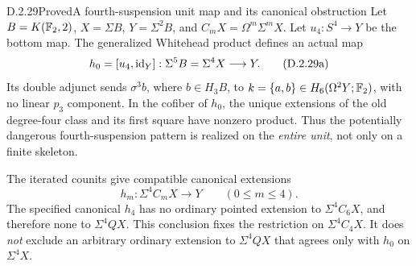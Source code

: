 \begin{claim}{D.2.29}{Proved}{A fourth-suspension unit map and its canonical obstruction}
Let $B=K(\mathbb F_2,2)$, $X=\Sigma B$, $Y=\Sigma^2B$, and
$C_mX=\Omega^m\Sigma^mX$.  Let $u_4:S^4\to Y$ be the
bottom map.  The generalized Whitehead product defines an actual map
\[
 h_0=[u_4,\mathrm{id}_Y]:\Sigma^5B=\Sigma^4X\longrightarrow Y.
 \tag{D.2.29a}
\]
Its double adjunct sends $\sigma^3b$, where $b\in H_3B$,
to $k=\{a,b\}\in H_6(\Omega^2Y;\mathbb F_2)$, with no linear
$p_3$ component.  In the cofiber of $h_0$, the unique extensions
of the old degree-four class and its first square have nonzero product.
Thus the potentially dangerous fourth-suspension pattern is realized
on the \emph{entire unit}, not only on a finite skeleton.

The iterated counits give compatible canonical extensions
\[
 h_m:\Sigma^4C_mX\longrightarrow Y\qquad(0\le m\le4).
 \tag{D.2.29b}
\]
The specified canonical $h_4$ has no ordinary pointed extension
to $\Sigma^4C_6X$, and therefore none to $\Sigma^4QX$.
This conclusion fixes the restriction on $\Sigma^4C_4X$.
It does \emph{not} exclude an arbitrary ordinary extension to
$\Sigma^4QX$ that agrees only with $h_0$ on $\Sigma^4X$.
\end{claim}
